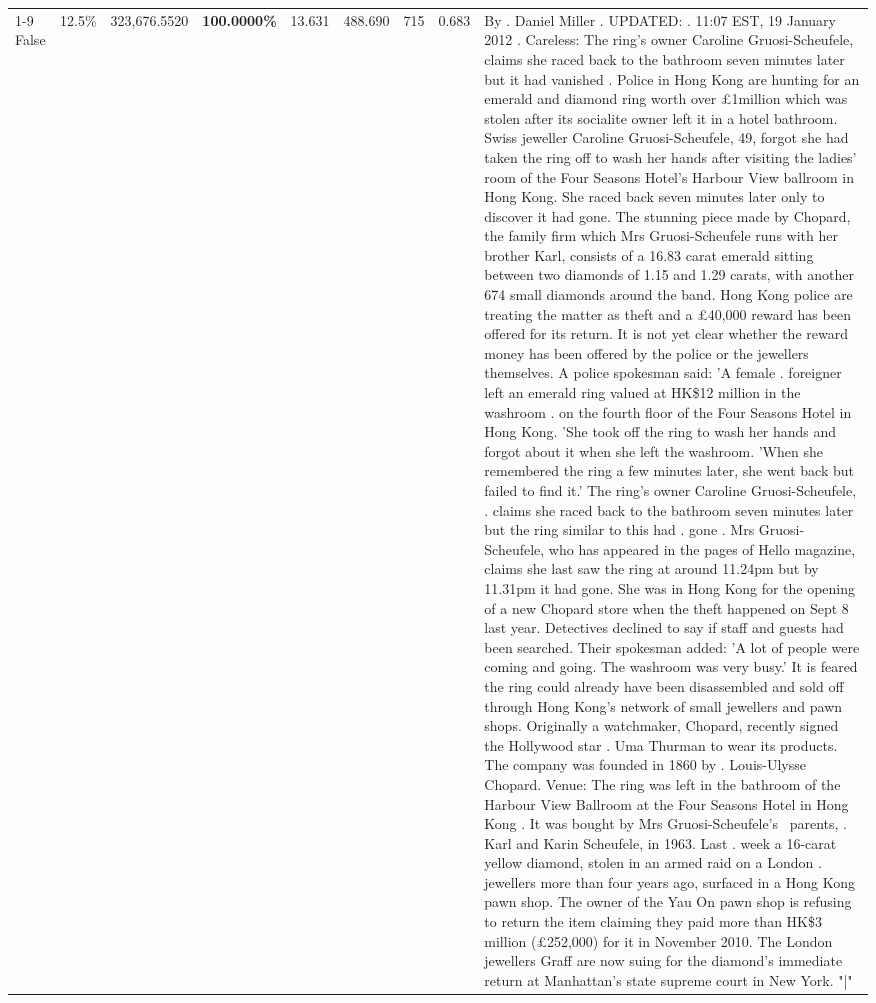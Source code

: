 \begin{table}[H]
\begin{tabular}{lllrlllll}
\cline{1-9}
False & 12.5\% & 323,676.5520 & \bfseries \color{red} 100.0000\% & 13.631 & 488.690 & 715 & 0.683 & By . Daniel Miller . UPDATED: . 11:07 EST, 19 January 2012 . Careless: The ring's owner Caroline Gruosi-Scheufele, claims she raced back to the bathroom seven minutes later but it had vanished . Police in Hong Kong are hunting for an emerald and diamond ring worth over £1million which was stolen after its socialite owner left it in a hotel bathroom. Swiss jeweller Caroline Gruosi-Scheufele, 49, forgot she had taken the ring off to wash her hands after visiting the ladies' room of the Four Seasons Hotel's Harbour View ballroom in Hong Kong. She raced back seven minutes later only to discover it had gone. The stunning piece made by Chopard, the family firm which Mrs Gruosi-Scheufele runs with her brother Karl, consists of a 16.83 carat emerald sitting between two diamonds of 1.15 and 1.29 carats, with another 674 small diamonds around the band. Hong Kong police are treating the matter as theft and a £40,000 reward has been offered for its return. It is not yet clear whether the reward money has been offered by the police or the jewellers themselves. A police spokesman said: 'A female . foreigner left an emerald ring valued at HK\$12 million in the washroom . on the fourth floor of the Four Seasons Hotel in Hong Kong. 'She took off the ring to wash her hands and forgot about it when she left the washroom. 'When she remembered the ring a few minutes later, she went back but failed to find it.' The ring's owner Caroline Gruosi-Scheufele, . claims she raced back to the bathroom seven minutes later but the ring similar to this had . gone . Mrs Gruosi-Scheufele, who has appeared in the pages of Hello magazine, claims she last saw the ring at around 11.24pm but by 11.31pm it had gone. She was in Hong Kong for the opening of a new Chopard store when the theft happened on Sept 8 last year. Detectives declined to say if staff and guests had been searched. Their spokesman added: 'A lot of people were coming and going. The washroom was very busy.' It is feared the ring could already have been disassembled and sold off through Hong Kong's network of small jewellers and pawn shops. Originally a watchmaker, Chopard, recently signed the Hollywood star . Uma Thurman to wear its products. The company was founded in 1860 by . Louis-Ulysse Chopard. Venue: The ring was left in the bathroom of the Harbour View Ballroom at the Four Seasons Hotel in Hong Kong . It was bought by Mrs Gruosi-Scheufele's  parents, . Karl and Karin Scheufele, in 1963. Last . week a 16-carat yellow diamond, stolen in an armed raid on a London . jewellers more than four years ago, surfaced in a Hong Kong pawn shop. The owner of the Yau On pawn shop is refusing to return the item claiming they paid more than HK\$3 million (£252,000) for it in November 2010. The London jewellers Graff are now suing for the diamond’s immediate return at Manhattan’s state supreme court in New York. "|" \\

\end{tabular}
\end{table}
